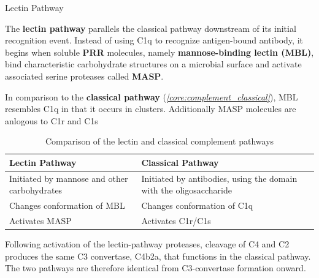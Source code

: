     \begin{core}[label=core:complement_lectin]{Lectin Pathway}

      The \textbf{lectin pathway} parallels the classical pathway downstream of its initial recognition event. Instead of using C1q to recognize antigen-bound antibody, it begins when soluble \textbf{PRR} molecules, namely \textbf{mannose-binding lectin (MBL)}, bind characteristic carbohydrate structures on a microbial surface and activate associated serine proteases called \textbf{MASP}.


      In comparison to the \textbf{classical pathway} (\textit{\autoref{core:complement_classical}}), MBL resembles C1q in that it occurs in clusters. Additionally MASP molecules are anlogous to C1r and C1s

      \begin{table}[H]
        \centering
        \begin{tabular}{>{\raggedright\arraybackslash}p{6cm}>{\raggedright\arraybackslash}p{6cm}}
          \hline
          \textbf{Lectin Pathway} & \textbf{Classical Pathway} \\
          \hline
          Initiated by mannose and other carbohydrates & Initiated by antibodies, using the domain with the oligosaccharide \\
          Changes conformation of MBL & Changes conformation of C1q \\
          Activates MASP & Activates C1r/C1s \\
          \hline
        \end{tabular}
        \caption{Comparison of the lectin and classical complement pathways}
        \label{tab:lectin_vs_classical}
      \end{table}

      Following activation of the lectin-pathway proteases, cleavage of C4 and C2 produces the same C3 convertase, C4b2a, that functions in the classical pathway. The two pathways are therefore identical from C3-convertase formation onward.

    \end{core}

